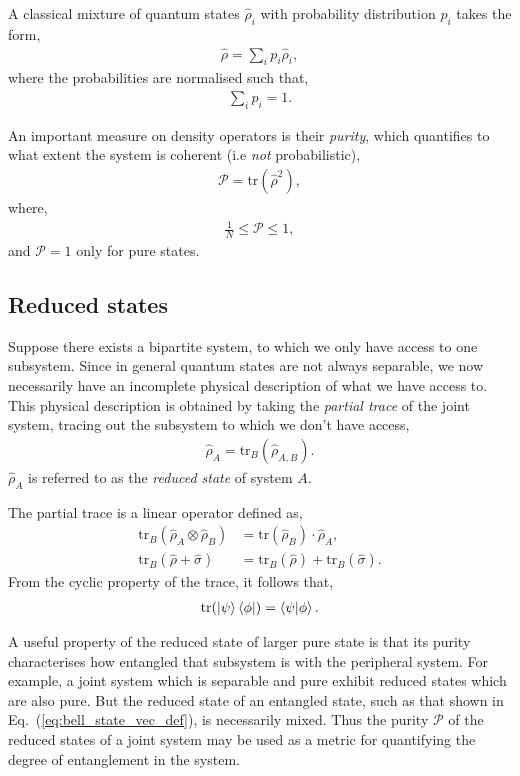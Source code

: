 \documentclass[aps,pra,twocolumn,amsmath,amssymb,nofootinbib,superscriptaddress]{revtex4}
\begin{document}
A classical mixture of quantum states $\hat\rho_i$ with probability distribution $p_i$ takes the form,
\begin{align}
	\hat\rho = \sum_i p_i \hat\rho_i,
\end{align}
where the probabilities are normalised such that,
\begin{align}
	\sum_i p_i = 1.
\end{align}

An important measure on density operators is their \textit{purity}, which quantifies to what extent the system is coherent (i.e \textit{not} probabilistic),
\begin{align}
\mathcal{P} = \mathrm{tr}(\hat\rho^2),
\end{align}
where,
\begin{align}
\frac{1}{N}\leq \mathcal{P}\leq 1,	
\end{align}
and \mbox{$\mathcal{P}=1$} only for pure states.

%
%

\subsection{Reduced states}

Suppose there exists a bipartite system, to which we only have access to one subsystem. Since in general quantum states are not always separable, we now necessarily have an incomplete physical description of what we have access to. This physical description is obtained by taking the \textit{partial trace} of the joint system, tracing out the subsystem to which we don't have access,
\begin{align}
\hat\rho_A = \mathrm{tr}_B(\hat\rho_{A,B}).	
\end{align}
$\hat\rho_A$ is referred to as the \textit{reduced state} of system $A$.

The partial trace is a linear operator defined as,
\begin{align}
\mathrm{tr}_B(\hat\rho_A\otimes\hat\rho_B) &= \mathrm{tr}(\hat\rho_B) \cdot \hat\rho_A,\nonumber\\
\mathrm{tr}_B(\hat\rho+\hat\sigma) &= \mathrm{tr}_B(\hat\rho) + \mathrm{tr}_B(\hat\sigma).
\end{align}
From the cyclic property of the trace, it follows that,
\begin{align}
\mathrm{tr}(\ket\psi\bra\phi) = \braket{\psi|\phi}.	
\end{align}

A useful property of the reduced state of larger pure state is that its purity characterises how entangled that subsystem is with the peripheral system. For example, a joint system which is separable and pure exhibit reduced states which are also pure. But the reduced state of an entangled state, such as that shown in Eq.~(\ref{eq:bell_state_vec_def}), is necessarily mixed. Thus the purity $\mathcal{P}$ of the reduced states of a joint system may be used as a metric for quantifying the degree of entanglement in the system.
\end{document}
